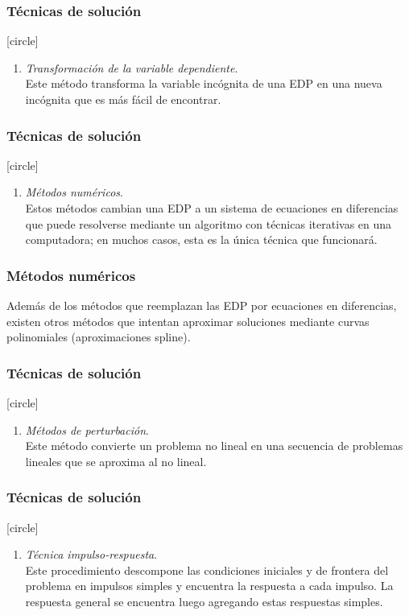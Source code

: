 \begin{frame}
\frametitle{Técnicas de solución}
[circle]
\begin{enumerate}
\conti
\item \emph{Transformación de la variable dependiente}.
\\
\bigskip
Este método transforma la variable incógnita de una EDP en una nueva incógnita que es más fácil de encontrar.
\seti
\end{enumerate}
\end{frame}
\begin{frame}
\frametitle{Técnicas de solución}
[circle]
\begin{enumerate}
\conti
\item \emph{Métodos numéricos}. 
\\
\bigskip
Estos métodos cambian una EDP a un sistema de ecuaciones en diferencias que puede resolverse mediante un algoritmo con técnicas iterativas en una computadora; en muchos casos, esta es la única técnica que funcionará. 
\seti
\end{enumerate}
\end{frame}
\begin{frame}
\frametitle{Métodos numéricos}
Además de los métodos que reemplazan las EDP por ecuaciones en diferencias, existen otros métodos que intentan aproximar soluciones mediante curvas polinomiales (aproximaciones spline).
\end{frame}
\begin{frame}
\frametitle{Técnicas de solución}
[circle]
\begin{enumerate}
\conti
\item \emph{Métodos de perturbación}.
\\
\bigskip
Este método convierte un problema no lineal en una secuencia de problemas lineales que se aproxima al no lineal.
\seti
\end{enumerate}
\end{frame}
\begin{frame}
\frametitle{Técnicas de solución}
[circle]
\begin{enumerate}
\conti
\item \emph{Técnica impulso-respuesta}.
\\
\bigskip
Este procedimiento descompone las condiciones iniciales y de frontera del problema en impulsos simples y encuentra la respuesta a cada impulso. La respuesta general se encuentra luego agregando estas respuestas simples.
\seti
\end{enumerate}
\end{frame}
